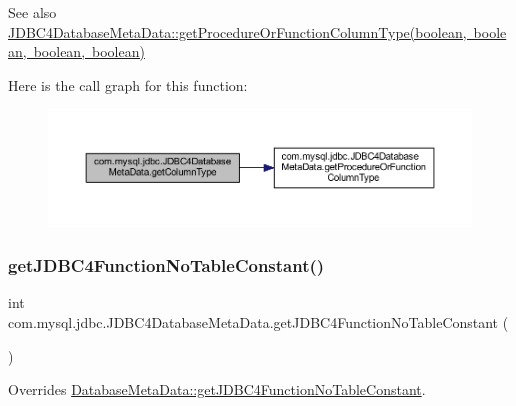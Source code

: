 \begin{DoxySeeAlso}{See also}
\mbox{\hyperlink{classcom_1_1mysql_1_1jdbc_1_1_j_d_b_c4_database_meta_data_a2792991e9a30eabf05de200840c80a42}{J\+D\+B\+C4\+Database\+Meta\+Data\+::get\+Procedure\+Or\+Function\+Column\+Type(boolean, boolean, boolean, boolean)}} 
\end{DoxySeeAlso}
Here is the call graph for this function\+:
\nopagebreak
\begin{figure}[H]
\begin{center}
\leavevmode
\includegraphics[width=350pt]{classcom_1_1mysql_1_1jdbc_1_1_j_d_b_c4_database_meta_data_a155ed928ee6454172e7e9eac80d923aa_cgraph}
\end{center}
\end{figure}
\mbox{\label{classcom_1_1mysql_1_1jdbc_1_1_j_d_b_c4_database_meta_data_abf83d93b8b11a9ab21da030bfa320c67}} 
\subsubsection{\texorpdfstring{get\+J\+D\+B\+C4\+Function\+No\+Table\+Constant()}{getJDBC4FunctionNoTableConstant()}}
{\footnotesize\ttfamily int com.\+mysql.\+jdbc.\+J\+D\+B\+C4\+Database\+Meta\+Data.\+get\+J\+D\+B\+C4\+Function\+No\+Table\+Constant (\begin{DoxyParamCaption}{ }\end{DoxyParamCaption})\hspace{0.3cm}{\ttfamily [protected]}}

Overrides \mbox{\hyperlink{classcom_1_1mysql_1_1jdbc_1_1_database_meta_data_a9f5f2d53d698291077d7cd3c283b29ec}{Database\+Meta\+Data\+::get\+J\+D\+B\+C4\+Function\+No\+Table\+Constant}}.

